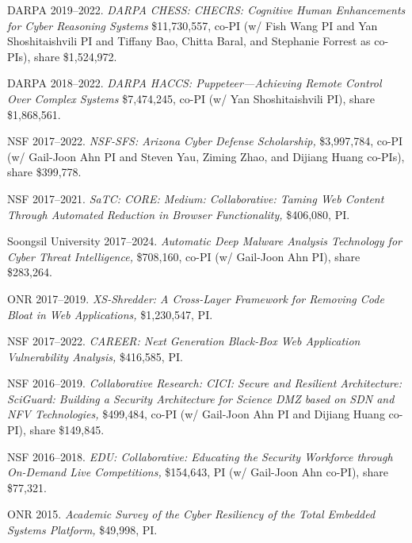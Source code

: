 \documentclass[11pt,letterpaper,sans]{moderncv}
\begin{document}
\begin{etaremune}

  \item DARPA 2019--2022. \textit{DARPA CHESS: CHECRS: Cognitive Human Enhancements for Cyber Reasoning Systems} \$11,730,557, co-PI (w/ Fish Wang PI and Yan Shoshitaishvili PI and Tiffany Bao, Chitta Baral, and Stephanie Forrest as co-PIs), share \$1,524,972.

  \item DARPA 2018--2022. \textit{DARPA HACCS: Puppeteer---Achieving Remote Control Over Complex Systems} \$7,474,245, co-PI (w/ Yan Shoshitaishvili PI), share \$1,868,561.
  
  \item NSF 2017--2022. \textit{NSF-SFS: Arizona Cyber Defense
    Scholarship,} \$3,997,784, co-PI (w/ Gail-Joon Ahn PI and Steven
    Yau, Ziming Zhao, and Dijiang Huang co-PIs), share \$399,778.

  \item NSF 2017--2021. \textit{SaTC: CORE: Medium: Collaborative:
    Taming Web Content Through Automated Reduction in Browser
    Functionality,} \$406,080, PI.

  \item Soongsil University 2017--2024. \textit{Automatic Deep Malware
    Analysis Technology for Cyber Threat Intelligence,} \$708,160,
    co-PI (w/ Gail-Joon Ahn PI), share \$283,264.

  \item ONR 2017--2019. \textit{XS-Shredder: A Cross-Layer Framework
    for Removing Code Bloat in Web Applications,} \$1,230,547, PI.

  \item NSF 2017--2022. \textit{CAREER: Next Generation Black-Box Web
    Application Vulnerability Analysis,} \$416,585, PI.
  
  \item NSF 2016--2019. \textit{Collaborative Research: CICI: Secure
    and Resilient Architecture: SciGuard: Building a Security
    Architecture for Science DMZ based on SDN and NFV Technologies,}
    \$499,484, co-PI (w/ Gail-Joon Ahn PI and Dijiang Huang co-PI),
    share \$149,845.

  \item NSF 2016--2018. \textit{EDU: Collaborative: Educating the
    Security Workforce through On-Demand Live Competitions,}
    \$154,643, PI (w/ Gail-Joon Ahn co-PI), share \$77,321.

  \item ONR 2015. \textit{Academic Survey of the Cyber Resiliency of
    the Total Embedded Systems Platform,} \$49,998, PI. 
  
\end{etaremune}
\end{document}
